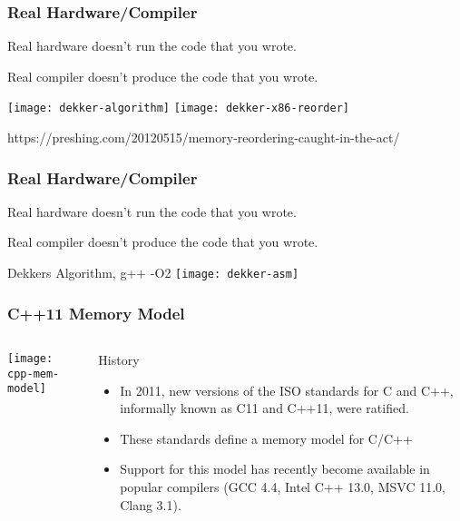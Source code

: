 \begin{frame}
    \frametitle{Real Hardware/Compiler}
    Real hardware doesn’t run the code that you wrote.
    
    Real compiler doesn’t produce the code that you wrote.
    
    \centering
    \texttt{[image: dekker-algorithm]}
    \texttt{[image: dekker-x86-reorder]}
    
    \tiny
    https://preshing.com/20120515/memory-reordering-caught-in-the-act/
\end{frame}
\begin{frame}
    \frametitle{Real Hardware/Compiler}
    Real hardware doesn’t run the code that you wrote.
    
    Real compiler doesn’t produce the code that you wrote.
    
    Dekkers Algorithm, g++ -O2
    \texttt{[image: dekker-asm]}
\end{frame}
\begin{frame}
    \frametitle{C++11 Memory Model}
    
    
    \begin{columns}
        
        \begin{column}{.4\textwidth}
            \texttt{[image: cpp-mem-model]}
        \end{column}
        \begin{column}{.6\textwidth}
            
            \Large
            History
            \normalsize
            \begin{itemize}
                \item In 2011, new versions of the ISO standards for C and C++,
                informally known as C11 and C++11, were ratified.
                
                \item These standards define a memory model for C/C++
                \item Support for this model has recently become available in popular
                compilers (GCC 4.4, Intel C++ 13.0, MSVC 11.0, Clang 3.1).
                
                
                
            \end{itemize}
        \end{column}
    \end{columns}
    
\end{frame}


